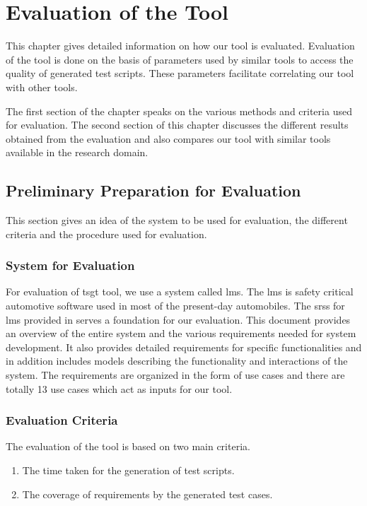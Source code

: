 
\chapter{Evaluation of the Tool}\label{evaluation} 
This chapter gives detailed information on how our tool is evaluated. Evaluation of the tool is done on the basis of parameters used by similar tools to access the quality of generated test scripts. These parameters facilitate correlating our tool with other tools.

The first section of the chapter speaks on the various methods and criteria used for evaluation. The second section of this chapter discusses the different results obtained from the evaluation and also compares our tool with similar tools available in the research domain.
\section{Preliminary Preparation for Evaluation}
This section gives an idea of the system to be used for evaluation, the different criteria and the procedure used for evaluation.
\subsection{System for Evaluation}
For evaluation of \gls{tsgt} tool, we use a system called \gls{lms}. The \gls{lms} is safety critical automotive software used in most of the present-day automobiles. The \glspl{srs} for \gls{lms} provided in \cite{blazysoftware} serves a foundation for our evaluation. This document provides an overview of the entire system and the various requirements needed for system development.  It also provides detailed requirements for specific functionalities and in addition includes models describing the functionality and interactions of the system. The requirements are organized in the form of use cases and there are totally 13 use cases which act as inputs for our tool.
\subsection{Evaluation Criteria}
The evaluation of the tool is based on two main criteria.
\begin{enumerate}
\item The time taken for the generation of test scripts.
\item The coverage of requirements by the generated test cases.
\end{enumerate}
